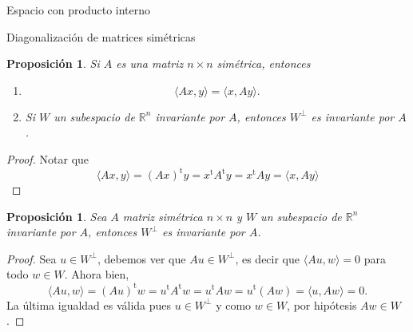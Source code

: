 \documentclass[a4paper,12pt,twoside,spanish,reqno]{amsbook}
\newtheorem{proposicion}[teorema]{Proposici\'on}
\theoremstyle{definition}
\theoremstyle{remark}
\newcommand{\la}{\langle}
\newcommand{\ra}{\rangle}
\renewcommand{\t}{{\operatorname{t}}}
\newcommand{\R}{\mathbb R}
\begin{document}
\begin{chapter}{Espacio con producto interno}
\begin{section}{Diagonalización de matrices simétricas}
\begin{proposicion}
    Si $A$ es una matriz $n \times n$ simétrica, entonces 
    \begin{enumerate}[label=\emph{\alph*})]
        \item 
        \begin{equation*}
        \la Ax,y \ra =  \la x,Ay \ra .
        \end{equation*}
        \item Si $W$ un subespacio de $\R^n$ invariante por $A$, entonces $W^\perp$ es invariante por $A$.
    \end{enumerate}
\end{proposicion}
\begin{proof}
    Notar que
    \begin{equation*}
    \la Ax,y \ra = (Ax)^\t y = x^\t A^\t y  = x^\t A y = \la x,Ay \ra 
    \end{equation*}
\end{proof}
    
    
    
    \begin{proposicion}\label{wperpinv}
        Sea $A$ matriz simétrica $n \times n$ y $W$ un subespacio de $\R^n$ invariante por $A$, entonces $W^\perp$ es invariante por $A$.
    \end{proposicion}
    \begin{proof}
        Sea $u \in W^\perp$,  debemos ver que $Au \in W^\perp$,  es decir que $\la Au,w\ra =0$ para todo $w \in W$. Ahora bien,
        \begin{equation*}
            \la Au,w\ra =(Au)^\t w = u^\t A^\t w =u^\t A w = u^\t (A w) = \la u, Aw\ra=0.  
        \end{equation*}
        La última igualdad es válida pues $u \in W^\perp$ y  como $w \in W$, por hipótesis $Aw \in W$.
    \end{proof}
    
    
    
     \begin{comment}
         \begin{proposicion} Sean $A$ y $B$ dos matrices simétricas. Entonces, $AB$  es simétrica si y sólo  si $A$ y $B$ conmutan. 
         \end{proposicion}
         \begin{proof}
         ($\Rightarrow$) Como $AB$ es simétrica, tenemos que $AB = (AB)^\t$. Por proposición \ref{prop-matriz-transpuesta} tenemos que  $(AB)^\t = B^\t A^\t$, y  como $A,B$ son simétricas, $B^\t A^\t = BA$. 
         Reconstruyendo las igualdades tenemos
         $$
         AB = (AB)^\t = B^\t A^\t = BA,
         $$
         es decir, $A$ y $B$ conmutan.
         

\end{comment}
\end{section}
\end{chapter}
\end{document}
